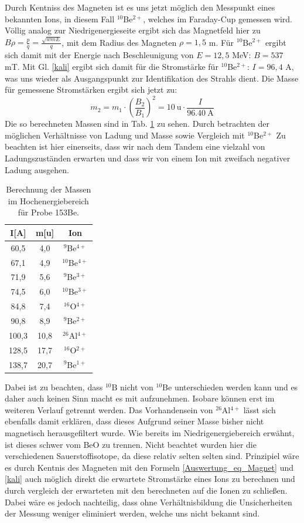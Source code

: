 Durch Kentniss des Magneten ist es uns jetzt möglich den Messpunkt eines bekannten Ions, in diesem Fall $^{10}$Be$^{2+}$, welches im Faraday-Cup gemessen wird.
Völlig analog zur Niedrigenergieseite ergibt sich das Magnetfeld hier zu $B \rho = \frac{p}{q} = \frac{\sqrt{wmE}}{q}$, mit dem Radius des Magneten $\rho = 1,5$ m.
Für $^{10}$Be$^{2+}$ ergibt sich damit mit der Energie nach Beschleunigung von $E = 12,5$ MeV: $B = 537$ mT.
Mit Gl. \ref{kali} ergibt sich damit für die Stromstärke für $^{10}$Be$^{2+}$: $I = 96,4$ A, was uns wieder als Ausgangspunkt zur Identifikation des Strahls dient.
Die Masse für gemessene Stromstärken ergibt sich jetzt zu:
\begin{equation}
m_2 = m_1 \cdot \left( \frac{B_2}{B_1} \right)^2 = 10 \: \text{u} \cdot \frac{I}{96.40 \: \text{A}}
\end{equation}
Die so berechneten Massen sind in Tab. \ref{highenergy} zu sehen.
Durch betrachten der möglichen Verhältnisse von Ladung und Masse sowie Vergleich mit $^{10}$Be$^{2+}$
Zu beachten ist hier einerseits, dass wir nach dem Tandem eine vielzahl von Ladungszuständen erwarten und dass wir von einem Ion mit zweifach negativer Ladung ausgehen.

\begin{table}[h]
\centering
\caption{Berechnung der Massen im Hochenergiebereich für Probe 153Be.}
\begin{tabular}{|c |c| c|}
\hline
I[A] & m[u] & Ion \\
\hline
60,5   & 4,0   &  $^{9}$Be$^{4+}$  \\
67,1   & 4,9   &  $^{10}$Be$^{4+}$ \\
71,9   & 5,6   &  $^{9}$Be$^{3+}$\\
74,5   & 6,0   &  $^{10}$Be$^{3+}$\\
84,8   & 7,4   &  $^{16}$O$^{4+}$ \\
90,8   & 8,9   &  $^{9}$Be$^{2+}$ \\
100,3 & 10,8 &  $^{26}$Al$^{4+}$\\
128,5 & 17,7 &  $^{16}$O$^{2+}$\\
138,7 & 20,7 &  $^{9}$Be$^{1+}$ \\
\hline
\end{tabular}
\label{highenergy}
\end{table}

Dabei ist zu beachten, dass $^{10}\text{B}$ nicht von $^{10}\text{Be}$ unterschieden werden kann und es daher auch keinen Sinn macht es mit aufzunehmen.
Isobare können erst im weiteren Verlauf getrennt werden.
Das Vorhandensein von $^{26}$Al$^{4+}$ lässt sich ebenfalls damit erklären, dass dieses Aufgrund seiner Masse bisher nicht magnetisch herausgefiltert wurde.
Wie bereits im Niedrigenergiebereich erwähnt, ist dieses schwer vom BeO zu trennen.
Nicht beachtet wurden hier die verschiedenen Sauerstoffisotope, da diese relativ selten selten sind.
Prinzipiel wäre es durch Kentnis des Magneten mit den Formeln \ref{Auswertung_eq_Magnet} und \ref{kali} auch möglich direkt die erwartete Stromstärke eines Ions zu berechnen und durch vergleich der erwarteten mit den berechneten auf die Ionen zu schließen.
Dabei wäre es jedoch nachteilig, dass ohne Verhältnisbildung die Unsicherheiten der Messung weniger eliminiert werden, welche uns nicht bekannt sind.

